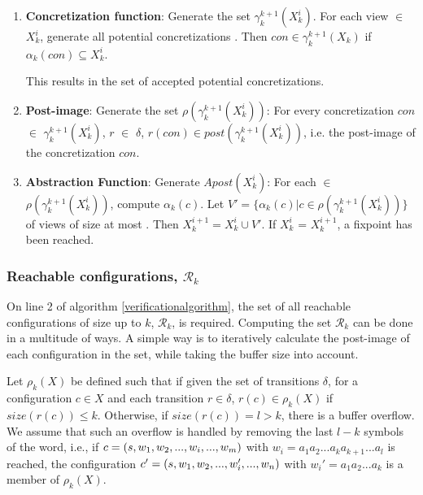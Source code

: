\begin{enumerate}
\item
\textbf{Concretization function}:
Generate the set $\gamma_k^{k+1}(X_k^i)$. For each view  $\in$ $X_k^i$, generate all potential concretizations . Then $con \in \gamma_k^{k+1}(X_k)$ if $\alpha_k(con) \subseteq X_k^i$.

This results in the set of accepted potential concretizations.

\item
\textbf{Post-image}:
Generate the set $\rho(\gamma_k^{k+1}(X_k^i))$: For every concretization $con$ $\in$ $\gamma_k^{k+1}(X_k^i)$, $r$ $\in$ $\delta$, $r(con) \in post(\gamma_k^{k+1}(X_k^i))$, i.e. the post-image of the concretization $con$.

\item
\textbf{Abstraction Function}:
Generate $Apost(X_k^i)$: For each  $\in$ $\rho(\gamma_k^{k+1}(X_k^i))$, compute $\alpha_k(c)$. Let $V' = \{\alpha_k(c)|c \in \rho(\gamma_k^{k+1}(X_k^i))\}$ of views of size at most . Then $X_k^{i+1} = X_k^i \cup V'$. If $X_k^i$ = $X_k^{i+1}$, a fixpoint has been reached.

\end{enumerate}

\subsubsection{Reachable configurations, $\mathcal{R}_k$}
\label{part2}
On line 2 of algorithm \ref{verificationalgorithm}, the set of all reachable configurations of size up to $k$, $\mathcal{R}_k$, is required. Computing the set $\mathcal{R}_k$ can be done in a multitude of ways. A simple way is to iteratively calculate the post-image of each configuration in the set, while taking the buffer size into account.

Let $\rho_k(X)$ be defined such that if given the set of transitions $\delta$, for a configuration $c \in X$ and each transition $r \in \delta$, $r(c) \in \rho_k(X)$ if $size(r(c)) \leq k$. Otherwise, if $size(r(c)) = l > k$, there is a buffer overflow. We assume that such an overflow is handled by removing the last $l-k$ symbols of the word, i.e., if $c = (s, w_1, w_2,..., w_i, ...,  w_m)$ with $w_i = a_1a_2...a_ka_{k+1}...a_l$ is reached, the configuration $c' = (s, w_1, w_2, ..., w_i', ..., w_n)$ with $w_i' = a_1a_2...a_k$ is a member of $\rho_k(X)$.

